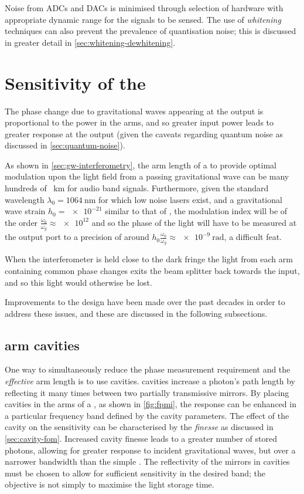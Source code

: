 Noise from \glspl{ADC} and \glspl{DAC} is minimised through selection of hardware with appropriate dynamic range for the signals to be sensed. The use of \emph{whitening} techniques can also prevent the prevalence of quantisation noise; this is discussed in greater detail in \cref{sec:whitening-dewhitening}.

\section{\label{sec:ifo-response}Sensitivity of the \MI{}}
The phase change due to gravitational waves appearing at the output is proportional to the power in the arms, and so greater input power leads to greater response at the output (given the caveats regarding quantum noise as discussed in \cref{sec:quantum-noise}).

As shown in \cref{sec:gw-interferometry}, the arm length of a \MI{} to provide optimal modulation upon the light field from a passing gravitational wave can be many hundreds of \SI{}{\kilo\meter} for audio band signals. Furthermore, given the standard wavelength $\lambda_0 = \SI{1064}{\nano\meter}$ for which low noise lasers exist, and a gravitational wave strain $h_0 = \num{e-21}$ similar to that of \GWFIRSTEVENT{}, the modulation index will be of the order $\frac{\omega_0}{\omega_g} \approx \num{e12}$ and so the phase of the light will have to be measured at the output port to a precision of around $h_0 \frac{\omega_0}{\omega_g} \approx \SI{e-9}{\radian}$, a difficult feat.

When the interferometer is held close to the dark fringe the light from each arm containing common phase changes exits the beam splitter back towards the input, and so this light would otherwise be lost.

Improvements to the \MI{} design have been made over the past decades in order to address these issues, and these are discussed in the following subsections.

\subsection{\label{sec:fabry-perot-cavities}\FP{} arm cavities}
One way to simultaneously reduce the phase measurement requirement and the \emph{effective} arm length is to use \FP{} cavities. \FP{} cavities increase a photon's path length by reflecting it many times between two partially transmissive mirrors. By placing \FP{} cavities in the arms of a \MI{}, as shown in \cref{fig:fpmi}, the response can be enhanced in a particular frequency band defined by the cavity parameters. The effect of the cavity on the sensitivity can be characterised by the \emph{finesse} as discussed in \cref{sec:cavity-fom}. Increased cavity finesse leads to a greater number of stored photons, allowing for greater response to incident gravitational waves, but over a narrower bandwidth than the simple \MI{}. The reflectivity of the mirrors in \FP{} cavities must be chosen to allow for sufficient sensitivity in the desired band; the objective is not simply to maximise the light storage time.

